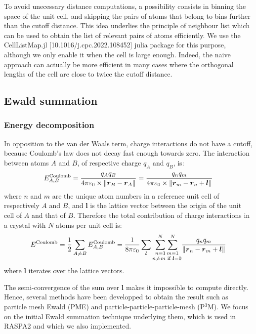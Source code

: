 \documentclass[main.tex]{subfiles}
\begin{document}
To avoid unecessary distance computations, a possibility consists in binning the space of the unit cell, and skipping the pairs of atoms that belong to bins further than the cutoff distance. This idea underlies the principle of neighbour list which can be used to obtain the list of relevant pairs of atoms efficiently. We use the CellListMap.jl [10.1016/j.cpc.2022.108452] julia package for this purpose, although we only enable it when the cell is large enough. Indeed, the naive approach can actually be more efficient in many cases where the orthogonal lengths of the cell are close to twice the cutoff distance.

\subsection{Ewald summation}

\subsubsection{Energy decomposition}

In opposition to the van der Waals term, charge interactions do not have a cutoff, because Coulomb's law does not decay fast enough towards zero. The interaction between atoms $A$ and $B$, of respective charge $q_A$ and $q_B$, is:
\[E^\text{Coulomb}_{A,B} = \frac{q_A q_B}{4\pi\varepsilon_0\times \left\|\boldsymbol r_B - \boldsymbol r_A\right\|} = \frac{q_n q_m}{4\pi\varepsilon_0\times \left\|\boldsymbol r_m - \boldsymbol r_n + \boldsymbol l\right\|}\]
where $n$ and $m$ are the unique atom numbers in a reference unit cell of respectively $A$ and $B$, and $\boldsymbol l$ is the lattice vector between the origin of the unit cell of $A$ and that of $B$.
Therefore the total contribution of charge interactions in a crystal with $N$ atoms per unit cell is:
\[E^\text{Coulomb} = \frac12\sum_{A\not\kern0.2ex= B}E^\text{Coulomb}_{A,B}
                   = \frac1{8\pi\varepsilon_0}\sum_{\boldsymbol l}\underset{n\not\kern0.2ex= m\text{ if }\boldsymbol l = 0}{\sum_{n=1}^N\sum_{m=1}^N} \frac{q_n q_m}{\left\|\boldsymbol r_n - \boldsymbol r_m + \boldsymbol l\right\|}\]
where $\boldsymbol l$ iterates over the lattice vectors.

The semi-convergence of the sum over $\boldsymbol l$ makes it impossible to compute directly. Hence, several methods have been developped to obtain the result such as particle mesh Ewald (PME) and particle-particle-particle-mesh (P$^3$M). We focus on the initial Ewald summation technique underlying them, which is used in RASPA2 and which we also implemented.
\end{document}
